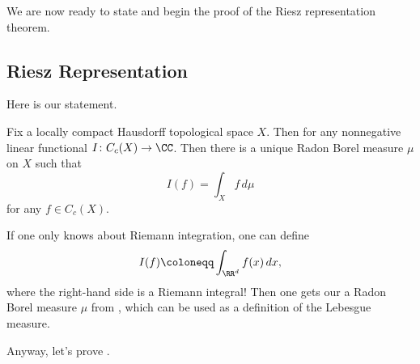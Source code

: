 \documentclass[../notes.tex]{subfiles}
\begin{document}
We are now ready to state and begin the proof of the Riesz representation theorem.

\subsection{Riesz Representation}
Here is our statement.
\begin{theorem} \label{thm:rr-1}
	Fix a locally compact Hausdorff topological space $X$. Then for any nonnegative linear functional $I\colon C_c(X)\to\CC$. Then there is a unique Radon Borel measure $\mu$ on $X$ such that
	\[I(f)=\int_Xf\,d\mu\]
	for any $f\in C_c(X)$.
\end{theorem}
\begin{remark}
	If one only knows about Riemann integration, one can define
	\[I(f)\coloneqq\int_{\RR^d}f(x)\,dx,\]
	where the right-hand side is a Riemann integral! Then one gets our a Radon Borel measure $\mu$ from , which can be used as a definition of the Lebesgue measure.
\end{remark}
Anyway, let's prove .
\end{document}
